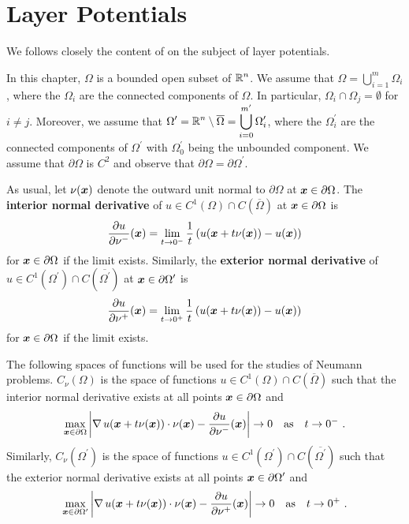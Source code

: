 \section{Layer Potentials} \label{potential_sect}

We follows closely the content of \cite{FoPDE} on
the subject of layer potentials.

In this chapter, $\Omega$ is a bounded open subset of $\displaystyle \mathbb{R}^n$.  We
assume that $\displaystyle \Omega = \bigcup_{i=1}^{m} \Omega_i$, where the
$\Omega_i$ are the connected components of $\Omega$.  In particular,
$\Omega_i \cap \Omega_j = \emptyset$ for $i\neq j$.  Moreover, we
assume that $\displaystyle \Omega^\prime = \mathbb{R}^n \setminus \overline{\Omega}
= \bigcup_{i=0}^{m^{\prime}} \Omega_i^{\prime}$,
where the $\displaystyle \Omega_i^{\prime}$ are the connected components of
$\displaystyle \Omega^{\prime}$ with
$\displaystyle \Omega_0^{\prime}$ being the unbounded component.
We assume that $\partial \Omega$ is $\displaystyle C^2$ and observe that
$\displaystyle \partial \Omega = \partial \Omega^{\prime}$.

As usual, let $\nu({\bm{x}})$ denote the outward unit normal to
$\partial \Omega$ at ${\bm{x}} \in \partial \Omega$.  The
{\bfseries interior normal derivative} of
$\displaystyle u \in C^1(\Omega) \cap C(\overline{\Omega})$ at
${\bm{x}} \in \partial \Omega$ is
\[
\frac{\partial{u}}{\partial \nu^-}({\bm{x}})
= \lim_{t\rightarrow 0^-} \frac{1}{t}
\left( u({\bm{x}} + t \nu({\bm{x}})) - u({\bm{x}})\right)
\]
for ${\bm{x}} \in \partial \Omega$ if the limit exists.  Similarly, the
{\bfseries exterior normal derivative} of
$\displaystyle u \in C^1(\Omega^{\prime}) \cap C(\overline{\Omega^{\prime}})$ at
$\displaystyle {\bm{x}} \in \partial \Omega^{\prime}$ is
\[
\frac{\partial{u}}{\partial \nu^+}({\bm{x}})
= \lim_{t\rightarrow 0^+} \frac{1}{t}
\left( u({\bm{x}} + t \nu({\bm{x}})) - u({\bm{x}}) \right)
\]
for ${\bm{x}} \in \partial \Omega$ if the limit exists.

The following spaces of functions will be used for the studies of
Neumann problems. $C_{\nu}(\Omega)$ is the space of functions
$\displaystyle u \in C^1(\Omega) \cap C(\overline{\Omega})$ such that the
interior normal derivative exists at all points
${\bm{x}} \in \partial \Omega$ and
\begin{equation} \label{pot_unif_ddn}
\max_{{\bm{x}}\in \partial \Omega}
\left| \operatorname{\nabla} u({\bm{x}} + t \nu({\bm{x}})) \cdot \nu({\bm{x}})
- \frac{\partial{u}}{\partial \nu^-}({\bm{x}}) \right| \rightarrow 0 \quad
\text{as} \quad t \rightarrow 0^- \ .
\end{equation}
Similarly, $\displaystyle C_{\nu}(\Omega^{\prime})$ is the space
of functions
$\displaystyle u \in C^1(\Omega^{\prime}) \cap C(\overline{\Omega^{\prime}})$
such that the exterior normal derivative exists at all points
$\displaystyle {\bm{x}} \in \partial \Omega^{\prime}$ and
\begin{equation} \label{pot_ddn_unif}
\max_{{\bm{x}}\in \partial \Omega^{\prime}}
\left| \operatorname{\nabla} u({\bm{x}} + t \nu({\bm{x}})) \cdot \nu({\bm{x}})
- \frac{\partial{u}}{\partial \nu^+}({\bm{x}}) \right| \rightarrow 0 \quad
\text{as} \quad t \rightarrow 0^+ \ .
\end{equation}

